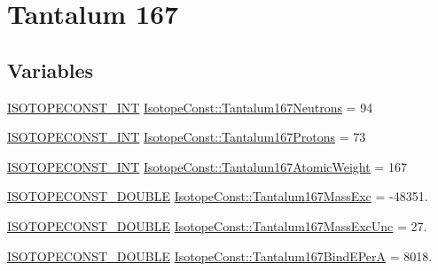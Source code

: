 \hypertarget{group___isotope_const-_tantalum-_ta167}{}\section{Tantalum 167}
\label{group___isotope_const-_tantalum-_ta167}
\subsection*{Variables}
\begin{DoxyCompactItemize}
\item 
\mbox{\hyperlink{group___isotope_const-_macros_ga5f18360b3e99483a35c32d789e62621c}{I\+S\+O\+T\+O\+P\+E\+C\+O\+N\+S\+T\+\_\+\+I\+NT}} \mbox{\hyperlink{group___isotope_const-_tantalum-_ta167_ga48fc7f94092b81a5d5b3b6fbd3bdb726}{Isotope\+Const\+::\+Tantalum167\+Neutrons}} = 94
\item 
\mbox{\hyperlink{group___isotope_const-_macros_ga5f18360b3e99483a35c32d789e62621c}{I\+S\+O\+T\+O\+P\+E\+C\+O\+N\+S\+T\+\_\+\+I\+NT}} \mbox{\hyperlink{group___isotope_const-_tantalum-_ta167_ga6568ab401d434545328f6eeb801659f5}{Isotope\+Const\+::\+Tantalum167\+Protons}} = 73
\item 
\mbox{\hyperlink{group___isotope_const-_macros_ga5f18360b3e99483a35c32d789e62621c}{I\+S\+O\+T\+O\+P\+E\+C\+O\+N\+S\+T\+\_\+\+I\+NT}} \mbox{\hyperlink{group___isotope_const-_tantalum-_ta167_gacbe060dd635fa9d0a767d170a633073e}{Isotope\+Const\+::\+Tantalum167\+Atomic\+Weight}} = 167
\item 
\mbox{\hyperlink{group___isotope_const-_macros_ga8f45a7272ce02c0b4c65c44636ed719a}{I\+S\+O\+T\+O\+P\+E\+C\+O\+N\+S\+T\+\_\+\+D\+O\+U\+B\+LE}} \mbox{\hyperlink{group___isotope_const-_tantalum-_ta167_ga4ca754fa08631559c943a82d32161a11}{Isotope\+Const\+::\+Tantalum167\+Mass\+Exc}} = -\/48351.
\item 
\mbox{\hyperlink{group___isotope_const-_macros_ga8f45a7272ce02c0b4c65c44636ed719a}{I\+S\+O\+T\+O\+P\+E\+C\+O\+N\+S\+T\+\_\+\+D\+O\+U\+B\+LE}} \mbox{\hyperlink{group___isotope_const-_tantalum-_ta167_gae4466100b60d0fb2e5d11fcaafa1c0bb}{Isotope\+Const\+::\+Tantalum167\+Mass\+Exc\+Unc}} = 27.
\item 
\mbox{\hyperlink{group___isotope_const-_macros_ga8f45a7272ce02c0b4c65c44636ed719a}{I\+S\+O\+T\+O\+P\+E\+C\+O\+N\+S\+T\+\_\+\+D\+O\+U\+B\+LE}} \mbox{\hyperlink{group___isotope_const-_tantalum-_ta167_ga6eb8c662d280e10fa252e1221df15c90}{Isotope\+Const\+::\+Tantalum167\+Bind\+E\+PerA}} = 8018.
\item 

\end{DoxyCompactItemize}
